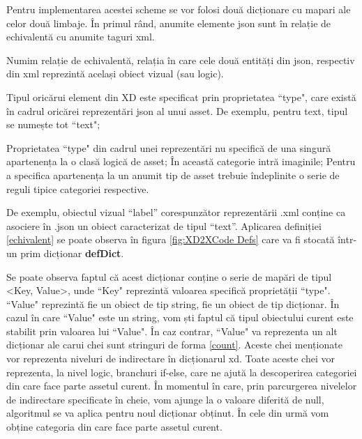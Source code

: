 Pentru implementarea acestei scheme se vor folosi două dicționare cu mapari ale celor două limbaje.  În primul rând, anumite elemente json sunt în relație de echivalentă cu anumite taguri xml. 


\begin{mydef}\label{echivalent}
Numim relație de echivalentă, relația în care cele două entități din json, respectiv din  xml reprezintă același obiect vizual (sau logic). 
\end{mydef}

\begin{myNote}\label{tip}
Tipul oricărui element din XD este specificat prin proprietatea ``type", care există în cadrul oricărei reprezentări json al unui asset. De exemplu, pentru text, tipul se numește tot ``text";
\end{myNote}

\begin{myNote}\label{echivalent}
Proprietatea ``type" din cadrul unei reprezentări nu specifică de una singură apartenența la o clasă logică de asset; În această categorie intră imaginile; Pentru a specifica apartenența la un anumit tip de asset trebuie îndeplinite o serie de reguli tipice categoriei respective.
\end{myNote}

De exemplu, obiectul vizual “label” corespunzător reprezentării .xml conține ca asociere în .json un obiect caracterizat de tipul “text”. Aplicarea definiției \ref{echivalent} se poate observa în figura \ref{fig:XD2XCode Defs} care va fi stocată într-un prim dicționar \textbf{defDict}.

Se poate observa faptul că acest dicționar conține o serie de mapări de tipul <Key, Value>, unde ``Key" reprezintă valoarea specifică proprietății ``type". ``Value" reprezintă fie un obiect de tip string, fie un obiect de tip dicționar. În cazul în care ``Value" este un string, vom ști faptul că tipul obiectului curent este stabilit prin valoarea lui ``Value". În caz contrar, ``Value" va reprezenta un alt dicționar ale carui chei sunt stringuri de forma \ref{count}. Aceste chei menționate vor reprezenta niveluri de indirectare în dicționarul xd. Toate aceste chei vor reprezenta, la nivel logic, branchuri if-else, care ne ajută la descoperirea categoriei din care face parte assetul curent. În momentul în care, prin parcurgerea nivelelor de indirectare specificate în cheie, vom ajunge la o valoare diferită de null, algoritmul se va aplica pentru noul dicționar obținut. În cele din urmă vom obține categoria din care face parte assetul curent. 

